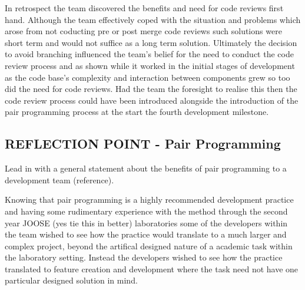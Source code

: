 \documentclass{l3proj}
\begin{document}
In retrospect the team discovered the benefits and need for code reviews first hand. Although the team effectively coped with the situation and problems which arose from not coducting pre or post merge code reviews such solutions were short term and would not suffice as a long term solution. Ultimately the decision to avoid branching influenced the team's belief for the need to conduct the code review process and as shown while it worked in the initial stages of development as the code base's complexity and interaction between components grew so too did the need for code reviews. Had the team the foresight to realise this then the code review process could have been introduced alongside the introduction of the pair programming process at the start the fourth development milestone.   


\subsection{REFLECTION POINT - Pair Programming}
\label{sec:pairprogramming}

Lead in with a general statement about the benefits of pair programming to a development team (reference). 

Knowing that pair programming is a highly recommended development practice and having some rudimentary experience with the method through the second year JOOSE (yes tie this in better) laboratories some of the developers within the team wished to see how the practice would translate to a much larger and complex project, beyond the artifical designed nature of a academic task within the laboratory setting. Instead the developers wished to see how the practice translated to feature creation and development where the task need not have one particular designed solution in mind.
\end{document}
